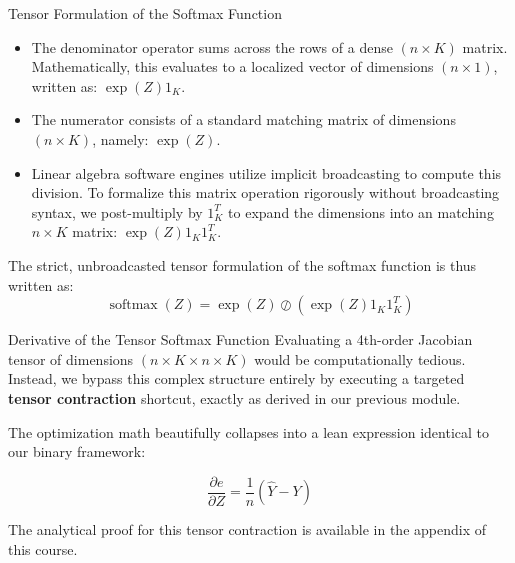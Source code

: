 \begin{frame}{Tensor Formulation of the Softmax Function}
	\begin{itemize}
		\item The denominator operator sums across the rows of a dense $(n \times K)$ matrix. Mathematically, this evaluates to a localized vector of dimensions $(n \times 1)$, written as: $\exp{(Z)} 1_K$.
		\pause
		\item The numerator consists of a standard matching matrix of dimensions $(n \times K)$, namely: $\exp{(Z)}$.
		\pause
		\item Linear algebra software engines utilize implicit broadcasting to compute this division. To formalize this matrix operation rigorously without broadcasting syntax, we post-multiply by $1_K^T$ to expand the dimensions into an matching $n \times K$ matrix: $\exp{(Z)} 1_K 1_K^T$.
	\end{itemize}
	The strict, unbroadcasted tensor formulation of the softmax function is thus written as:
	\begin{equation*}
		\operatorname{softmax}(Z) = \exp{(Z)} \oslash \left(\exp{(Z)} 1_K 1_K^T\right)
	\end{equation*}
\end{frame}

\begin{frame}{Derivative of the Tensor Softmax Function}
	Evaluating a 4th-order Jacobian tensor of dimensions $(n \times K \times n \times K)$ would be computationally tedious. Instead, we bypass this complex structure entirely by executing a targeted \textbf{tensor contraction} shortcut, exactly as derived in our previous module.
	
	\vspace{0.5cm}
	
	The optimization math beautifully collapses into a lean expression identical to our binary framework:
	
	\begin{equation*}
		\frac{\partial{e}}{\partial{Z}} = \frac{1}{n} \left(\hat{Y} - Y \right)
	\end{equation*}
	
	The analytical proof for this tensor contraction is available in the appendix of this course.
\end{frame}

